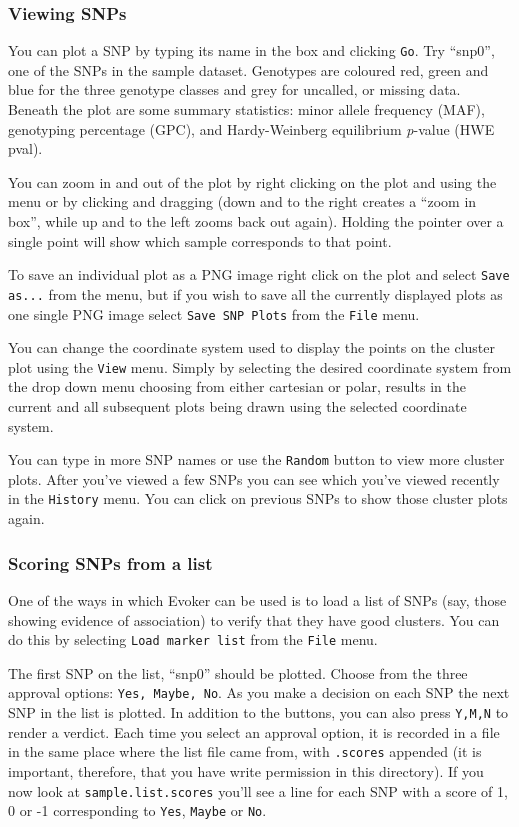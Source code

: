 \documentclass{article}
\begin{document}
\subsubsection{Viewing SNPs}
You can plot a SNP by typing its name in the box and clicking \texttt{Go}. Try ``snp0'', one of the SNPs in the sample dataset. Genotypes are coloured red, green and blue for the three genotype classes and grey for uncalled, or missing data. Beneath the plot are some summary statistics: minor allele frequency (MAF), genotyping percentage (GPC), and Hardy-Weinberg equilibrium \emph{p}-value (HWE pval). 
 
You can zoom in and out of the plot by right clicking on the plot and using the menu or by clicking and dragging (down and to the right creates a ``zoom in box'', while up and to the left zooms back out again). Holding the pointer over a single point will show which sample corresponds to that point.

To save an individual plot as a PNG image right click on the plot and select \texttt{Save as...} from the menu, but if you wish to save all the currently displayed plots as one single PNG image select \texttt{Save SNP Plots} from the \texttt{File} menu.

You can change the coordinate system used to display the points on the cluster plot using the \texttt{View} menu. Simply by selecting the desired coordinate system from the drop down menu choosing from either cartesian or polar, results in the current and all subsequent plots being drawn using the selected coordinate system. 

You can type in more SNP names or use the \texttt{Random} button to view more cluster plots. After you've viewed a few SNPs you can see which you've viewed recently in the \texttt{History} menu. You can click on previous SNPs to show those cluster plots again.

\subsubsection{Scoring SNPs from a list}

One of the ways in which Evoker can be used is to load a list of SNPs (say, those showing evidence of association) to verify that they have good clusters. You can do this by selecting \texttt{Load marker list} from the \texttt{File} menu.

The first SNP on the list, ``snp0'' should be plotted. Choose from the three approval options: \texttt{Yes, Maybe, No}. As you make a decision on each SNP the next SNP in the list is plotted. In addition to the buttons, you can also press \texttt{Y,M,N} to render a verdict. Each time you select an approval option, it is recorded in a file in the same place where the list file came from, with \texttt{.scores} appended (it is important, therefore, that you have write permission in this directory). If you now look at \texttt{sample.list.scores} you'll see a line for each SNP with a score of 1, 0 or -1 corresponding to \texttt{Yes}, \texttt{Maybe} or \texttt{No}. 
\end{document}
